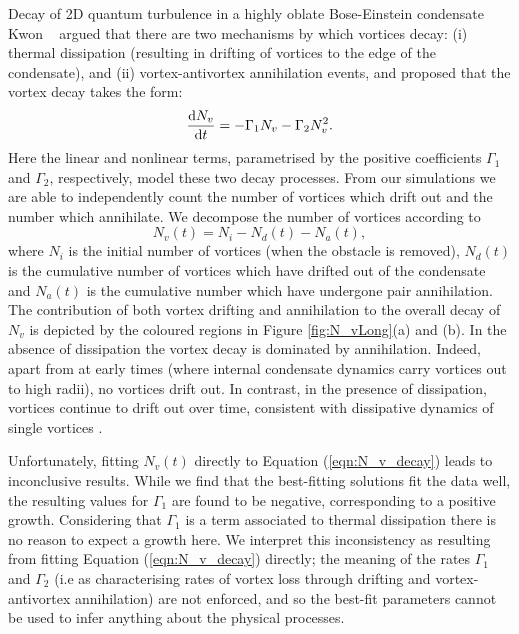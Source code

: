 \begin{chapter}{\label{cha:shin}Decay of 2D quantum turbulence in a highly oblate Bose-Einstein condensate}
  Kwon {\etal}~\citep{kwon_moon_14} argued that there are two mechanisms 
by which vortices decay: (i) thermal dissipation
(resulting in drifting of vortices to the edge of the condensate),
and (ii) vortex-antivortex annihilation events, and proposed
that the vortex decay takes the form:
\begin{equation}
\frac{{\rm d}N_v}{{\rm d}t}= - \Gamma_1 N_v - \Gamma_2 N_v^2.
\label{eqn:N_v_decay}
\end{equation}
Here the linear and nonlinear terms, parametrised by the positive
coefficients $\Gamma_1$ and $\Gamma_2$, respectively, model
these two decay processes.  From our simulations we are able to independently count the number of vortices which drift out and the number which annihilate.  
We decompose the number of vortices according to 
\begin{equation}
  N_v(t) = N_i - N_d(t) - N_a(t),
\label{eqn:N_v_decomp}
\end{equation}
where $N_i$ is the initial number of vortices (when the obstacle is removed), $N_d(t)$ is the cumulative number of vortices which have drifted out of the condensate and $N_a(t)$ is the cumulative number which have undergone pair annihilation.
The contribution of both vortex drifting and annihilation to the overall decay of $N_v$ is depicted by the coloured regions in Figure \ref{fig:N_vLong}(a) and (b).  In the absence of dissipation  the vortex decay is dominated by annihilation.  Indeed, apart from at early times (where internal condensate dynamics carry vortices out to high radii), no vortices drift out.  In contrast, in the presence of dissipation, vortices continue to drift out over time, consistent with dissipative dynamics of single vortices \citep{allen_zaremba_13}.

Unfortunately, fitting $N_v(t)$ directly to Equation (\ref{eqn:N_v_decay}) leads to inconclusive results. While we find that the best-fitting solutions fit the data well, the resulting values for $\Gamma_1$ are found to be negative, corresponding to a positive growth. Considering that $\Gamma_1$ is a term associated to thermal dissipation there is no reason to expect a growth here. We interpret this inconsistency as resulting from fitting Equation (\ref{eqn:N_v_decay}) directly; the meaning of the rates $\Gamma_1$ and $\Gamma_2$ (i.e as characterising rates of vortex loss through drifting and vortex-antivortex annihilation) are not enforced, and so the best-fit parameters cannot be used to infer anything about the physical processes.


\end{chapter}
